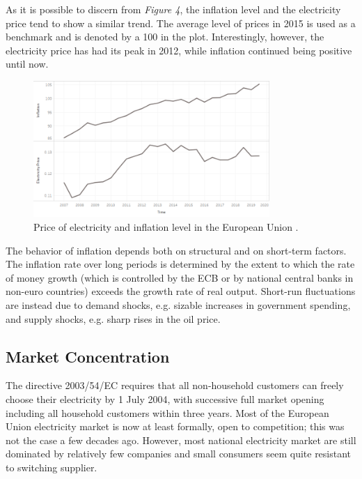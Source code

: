 \documentclass{book}
\begin{document}
As it is possible to discern from \textit{Figure 4}, the inflation level and the electricity price tend to show a similar trend. The average level of prices in 2015 is used as a benchmark and is denoted by a 100 in the plot. Interestingly, however, the electricity price has had its peak in 2012, while inflation continued being positive until now. 

\bigskip
\begin{figure}[H]
\begin{center}
\captionsetup{justification=centering}
\includegraphics[width=0.8\textwidth]{Images/inf.png}
\caption{Price of electricity and inflation level in the European Union . }
\end{center}
\end{figure}
\bigskip

The behavior of inflation depends both on structural and on short-term factors. The inflation rate over long periods is determined by the extent to which the rate of money growth (which is controlled by the ECB or by national central banks in non-euro countries) exceeds the growth rate of real output. Short-run fluctuations are instead due to demand shocks, e.g. sizable increases in government spending, and supply shocks, e.g. sharp rises in the oil price. \cite{ball1993causes}

\subsection*{Market Concentration}

The directive 2003/54/EC requires that all non-household customers can freely choose their electricity by 1 July 2004, with successive full market opening including all household customers within three years. Most of the European Union electricity market is now at least formally, open to competition; this was not the case a few decades ago. However, most national electricity market are still dominated by relatively few companies and small consumers seem quite resistant to switching supplier. \cite{jamasb2005electricity} \\
\end{document}
